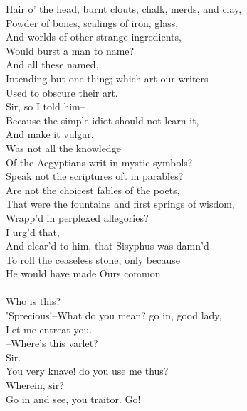 \documentclass{memoir}
\begin{document}
\begin{drama*}
 Hair o' the head, burnt clouts, chalk, merds, and clay,\\
 Powder of bones, scalings of iron, glass,\\
 And worlds of other strange ingredients,\\
 Would burst a man to name?\\
\subtlespeaks {} And all these named,\\
 Intending but one thing; which art our writers\\
 Used to obscure their art.\\
\mammonspeaks {} Sir, so I told him--\\
 Because the simple idiot should not learn it,\\
 And make it vulgar.\\
\subtlespeaks {} Was not all the knowledge\\
 Of the Aegyptians writ in mystic symbols?\\
 Speak not the scriptures oft in parables?\\
 Are not the choicest fables of the poets,\\
 That were the fountains and first springs of wisdom,\\
 Wrapp'd in perplexed allegories?\\
\mammonspeaks {} I urg'd that,\\
 And clear'd to him, that Sisyphus was damn'd\\
 To roll the ceaseless stone, only because\\
 He would have made Ours common.\\
\dolspeaks {}--\\
 Who is this?\\
\subtlespeaks {} 'Sprecious!--What do you mean? go in, good lady,\\
 Let me entreat you.\\
 --Where's this varlet?\\
\facespeaks {} Sir.\\
\subtlespeaks {} You very knave! do you use me thus?\\
\facespeaks  Wherein, sir?\\
\subtlespeaks {} Go in and see, you traitor. Go!\\

\end{drama*}
\end{document}
